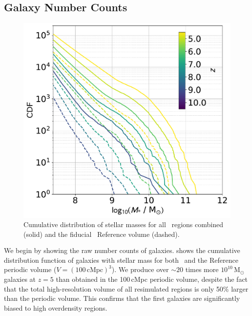 \subsection{Galaxy Number Counts}

\begin{figure}
    \centering
    \includegraphics[width=\columnwidth]{images/compare_cumulative.pdf}
    \caption{Cumulative distribution of stellar masses for all \flares\ regions combined (solid) and the fiducial \eagle\ Reference volume (dashed).}
    \label{fig:comp_hist}
\end{figure}

We begin by showing the raw number counts of galaxies.
 shows the cumulative distribution function of galaxies with stellar mass for both \flares\ and the Reference periodic volume ($V = (100 \, \mathrm{cMpc})^3$).
We produce over $\sim 20$ times more $10^{10} \, \mathrm{M_{\odot}}$ galaxies at $z = 5$ than obtained in the 100\,cMpc periodic volume, despite the fact that the total high-resolution volume of all resimulated regions is only 50\% larger than the periodic volume.
This confirms that the first galaxies are significantly biased to high overdensity regions.
